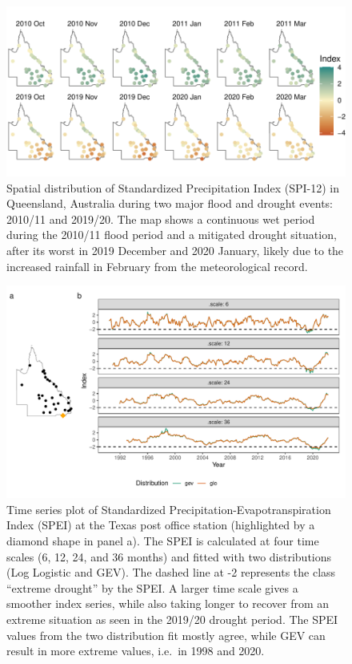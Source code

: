 \documentclass[
]{interact}
\begin{document}
\begin{figure}

{\centering \includegraphics{tidyindex_files/figure-pdf/fig-compute-spatial-1.pdf}

}

\caption{\label{fig-compute-spatial}Spatial distribution of Standardized
Precipitation Index (SPI-12) in Queensland, Australia during two major
flood and drought events: 2010/11 and 2019/20. The map shows a
continuous wet period during the 2010/11 flood period and a mitigated
drought situation, after its worst in 2019 December and 2020 January,
likely due to the increased rainfall in February from the meteorological
record.}

\end{figure}

\begin{figure}

{\centering \includegraphics{tidyindex_files/figure-pdf/fig-compute-temporal-1.pdf}

}

\caption{\label{fig-compute-temporal}Time series plot of Standardized
Precipitation-Evapotranspiration Index (SPEI) at the Texas post office
station (highlighted by a diamond shape in panel a). The SPEI is
calculated at four time scales (6, 12, 24, and 36 months) and fitted
with two distributions (Log Logistic and GEV). The dashed line at -2
represents the class ``extreme drought'' by the SPEI. A larger time
scale gives a smoother index series, while also taking longer to recover
from an extreme situation as seen in the 2019/20 drought period. The
SPEI values from the two distribution fit mostly agree, while GEV can
result in more extreme values, i.e.~in 1998 and 2020.}

\end{figure}
\end{document}

